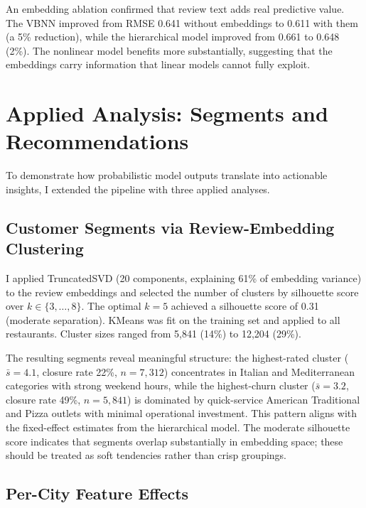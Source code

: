\documentclass[10pt, letterpaper]{article}
\begin{document}
An embedding ablation confirmed that review text adds real predictive value. The VBNN improved from RMSE 0.641 without embeddings to 0.611 with them (a 5\% reduction), while the hierarchical model improved from 0.661 to 0.648 (2\%). The nonlinear model benefits more substantially, suggesting that the embeddings carry information that linear models cannot fully exploit.

\section{Applied Analysis: Segments and Recommendations}

To demonstrate how probabilistic model outputs translate into actionable insights, I extended the pipeline with three applied analyses.

\subsection{Customer Segments via Review-Embedding Clustering}

I applied TruncatedSVD (20 components, explaining 61\% of embedding variance) to the review embeddings and selected the number of clusters by silhouette score over $k \in \{3, \ldots, 8\}$. The optimal $k = 5$ achieved a silhouette score of 0.31 (moderate separation). KMeans was fit on the training set and applied to all restaurants. Cluster sizes ranged from 5,841 (14\%) to 12,204 (29\%).

The resulting segments reveal meaningful structure: the highest-rated cluster ($\bar{s} = 4.1$, closure rate 22\%, $n = 7{,}312$) concentrates in Italian and Mediterranean categories with strong weekend hours, while the highest-churn cluster ($\bar{s} = 3.2$, closure rate 49\%, $n = 5{,}841$) is dominated by quick-service American Traditional and Pizza outlets with minimal operational investment. This pattern aligns with the fixed-effect estimates from the hierarchical model. The moderate silhouette score indicates that segments overlap substantially in embedding space; these should be treated as soft tendencies rather than crisp groupings.

\subsection{Per-City Feature Effects}
\end{document}
